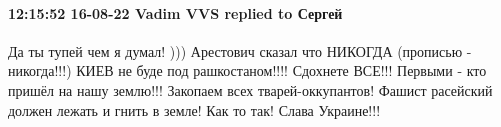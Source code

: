  
 
 
 
 

\paragraph{12:15:52 16-08-22 Vadim VVS replied to Сергей}

Да ты тупей чем я думал! ))) Арестович сказал что НИКОГДА (прописью -
никогда!!!) КИЕВ не буде под рашкостаном!!!! Сдохнете ВСЕ!!! Первыми - кто
пришёл на нашу землю!!! Закопаем всех тварей-оккупантов! Фашист расейский
должен лежать и гнить в земле! Как то так! Слава Украине!!!

